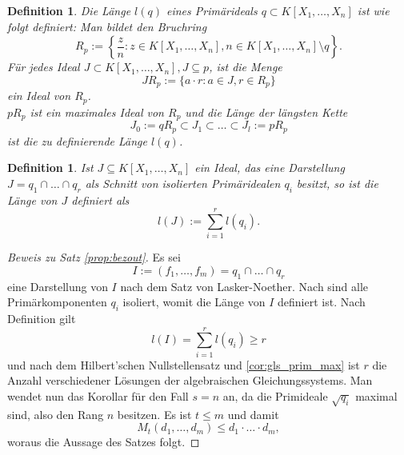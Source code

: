 \documentclass[11pt]{beamer}
\newcommand{\coloneqq}{:=}
\theoremstyle{custom}
\theoremstyle{custom}
\newtheorem{dfn}[theorem]{Definition}
\begin{document}
	\begin{frame}
		\begin{dfn}
			\pause
			Die Länge $l(q)$ eines Primärideals $q \subset K[X_1,\ldots,X_n]$ ist wie folgt definiert: Man bildet den Bruchring \[R_p \coloneqq \left\lbrace \frac{z}{n} \colon z \in  K[X_1,\ldots,X_n], n \in  K[X_1,\ldots,X_n] \setminus q \right\rbrace.\]
			Für jedes Ideal $J \subset K[X_1,\ldots,X_n], J \subseteq p$, ist die Menge \[JR_p \coloneqq \{a\cdot r \colon a \in J, r \in R_p\}\]
			ein Ideal von $R_p$.\\
			$pR_p$ ist ein maximales Ideal von $R_p$ und die Länge der längsten Kette \[J_0 \coloneqq qR_p \subset J_1 \subset \ldots \subset J_l \coloneqq pR_p\] ist die zu definierende Länge $l(q)$.
		\end{dfn}
	\end{frame}
	\begin{frame}
		\begin{dfn}
			Ist $J \subseteq K[X_1,\ldots,X_n]$ ein Ideal, das eine Darstellung $J = q_1 \cap \ldots \cap q_r$ als Schnitt von isolierten Primäridealen $q_i$ besitzt, so ist die Länge von $J$ definiert als \[l(J) \coloneqq \sum_{i=1}^{r} l(q_i).\]
		\end{dfn}
	\end{frame}
	\begin{frame}
		\begin{proof}[Beweis zu Satz \ref{prop:bezout}]
			\pause
			Es sei \[I \coloneqq (f_1, \ldots, f_m) = q_1 \cap \ldots \cap q_r\] eine Darstellung von $I$ nach dem Satz von Lasker-Noether. Nach sind alle Primärkomponenten $q_i$ isoliert, womit die Länge von $I$ definiert ist. Nach Definition gilt \[l(I) = \sum_{i=1}^{r} l(q_i)\geq r\] und nach dem Hilbert'schen Nullstellensatz und \ref{cor:gls_prim_max} ist $r$ die Anzahl verschiedener Lösungen der algebraischen Gleichungssystems. Man wendet nun das Korollar für den Fall $s=n$ an, da die Primideale $\sqrt{q_i}$ maximal sind, also den Rang $n$ besitzen. Es ist $t \leq m$ und damit \[M_t(d_1, \ldots, d_m) \leq d_1 \cdot \ldots \cdot d_m,\] woraus die Aussage des Satzes folgt.
		\end{proof}
	\end{frame}
\end{document}
